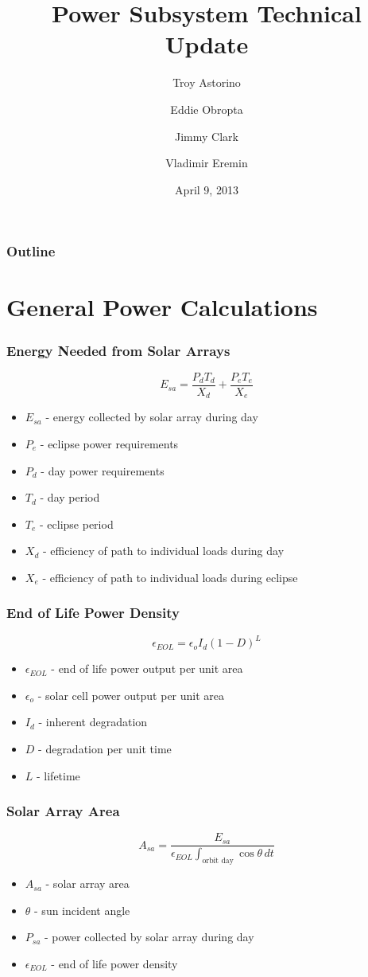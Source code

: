 \documentclass{beamer}
\title{Power Subsystem Technical Update}
\author{Troy Astorino \and Eddie Obropta \and Jimmy Clark \and Vladimir Eremin}
\date{April 9, 2013}
\institute[16.83 -- MIT]{Space Systems Design \\ Massachusetts Institute of
  Technology}
\begin{document}
\begin{frame}
\maketitle
\end{frame}

\begin{frame}
  \frametitle{Outline}
  \tableofcontents
\end{frame}

\section{General Power Calculations}
\begin{frame}
  \frametitle{Energy Needed from Solar Arrays}
  \[E_{sa} = \frac{P_d T_d}{X_d} + \frac{P_e T_e}{X_e}\]

  \begin{itemize}
    \item $E_{sa}$ - energy collected by solar array during day
    \item $P_e$ - eclipse power requirements
    \item $P_d$ - day power requirements
    \item $T_d$ - day period
    \item $T_e$ - eclipse period
    \item $X_d$ - efficiency of path to individual loads during day
    \item $X_e$ - efficiency of path to individual loads during eclipse
  \end{itemize}
\end{frame}

\begin{frame}
  \frametitle{End of Life Power Density}
  \[\epsilon_{EOL} = \epsilon_o I_d (1 - D)^L\]

  \begin{itemize}
    \item $\epsilon_{EOL}$ - end of life power output per unit area
    \item $\epsilon_o$ - solar cell power output per unit area
    \item $I_d$ - inherent degradation
    \item $D$ - degradation per unit time
    \item $L$ - lifetime
  \end{itemize}
\end{frame}

\begin{frame}
  \frametitle{Solar Array Area}
  \[A_{sa} = \frac{E_{sa}}{\epsilon_{EOL} \displaystyle \int_{\text{orbit day}} \cos{\theta}\,dt}\]

  \begin{itemize}
    \item $A_{sa}$ - solar array area
    \item $\theta$ - sun incident angle
    \item $P_{sa}$ - power collected by solar array during day
    \item $\epsilon_{EOL}$ - end of life power density
  \end{itemize}
\end{frame}
\end{document}
